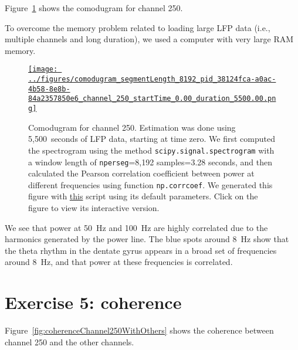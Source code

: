 \documentclass[12pt]{article}
\begin{document}
Figure~\ref{fig:comodugramChannel250} shows the comodugram for channel 250.

To overcome the memory problem related to loading large LFP data (i.e.,
multiple channels and long duration), we used a computer with very large RAM memory.

\begin{figure}[H]
    \begin{center}
        \href{https://www.gatsby.ucl.ac.uk/~rapela/neuroinformatics/2023/ws3/figures/comodugram_segmentLength_8192_pid_38124fca-a0ac-4b58-8e8b-84a2357850e6_channel_250_startTime_0.00_duration_5500.00.html}{\texttt{[image: ../figures/comodugram\_segmentLength\_8192\_pid\_38124fca-a0ac-4b58-8e8b-84a2357850e6\_channel\_250\_startTime\_0.00\_duration\_5500.00.png]}}



        \caption{Comodugram for channel 250. Estimation was done using
        5,500~seconds of LFP data, starting at time zero. We first computed the
        spectrogram using the method \texttt{scipy.signal.spectrogram} with a
        window length of \texttt{nperseg}=8,192 samples=3.28 seconds, and then
        calculated the Pearson correlation coefficient between power at
        different frequencies using function \texttt{np.corrcoef}.  We
        generated this figure with
        \href{https://github.com/joacorapela/neuroinformatics23/blob/master/worksheets/ws3/mySolution/code/scripts/doPlotComodugram.py}{this}
        script using its default parameters.  Click on the figure to view its
        interactive version.  }

                \label{fig:comodugramChannel250}

            \end{center}
        \end{figure}

We see that power at 50~Hz and 100~Hz are highly correlated due to the
harmonics generated by the power line. The blue spots around 8~Hz show that
the theta rhythm in the dentate gyrus appears in a broad set of frequencies
around 8~Hz, and that power at these frequencies is correlated.

\section*{Exercise 5: coherence}

Figure~\ref{fig:coherenceChannel250WithOthers} shows the coherence between
channel 250 and the other channels.
\end{document}

